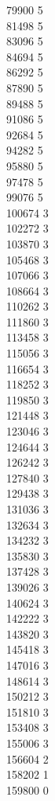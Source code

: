 { 79900	5 \\
 81498	5 \\
 83096	5 \\
 84694	5 \\
 86292	5 \\
 87890	5 \\
 89488	5 \\
 91086	5 \\
 92684	5 \\
 94282	5 \\
 95880	5 \\
 97478	5 \\
 99076	5 \\
 100674	3 \\
 102272	3 \\
 103870	3 \\
 105468	3 \\
 107066	3 \\
 108664	3 \\
 110262	3 \\
 111860	3 \\
 113458	3 \\
 115056	3 \\
 116654	3 \\
 118252	3 \\
 119850	3 \\
 121448	3 \\
 123046	3 \\
 124644	3 \\
 126242	3 \\
 127840	3 \\
 129438	3 \\
 131036	3 \\
 132634	3 \\
 134232	3 \\
 135830	3 \\
 137428	3 \\
 139026	3 \\
 140624	3 \\
 142222	3 \\
 143820	3 \\
 145418	3 \\
 147016	3 \\
 148614	3 \\
 150212	3 \\
 151810	3 \\
 153408	3 \\
 155006	3 \\
 156604	2 \\
 158202	1 \\
 159800	0 \\
}
